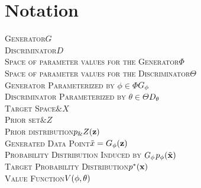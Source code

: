 \section*{Notation}
\vspace{3cm}
\begin{center}
  \begin{minipage}[c]{0.8\linewidth}
    \begin{center}
      \scshape
      Generator\dotfill $G$ \\
      Discriminator\dotfill $D$ \\
      Space of parameter values for the Generator\dotfill $\Phi$ \\
      Space of parameter values for the Discriminator\dotfill $\Theta$ \\
      Generator Parameterized by $\phi \in \Phi$\dotfill $G_\phi$ \\
      Discriminator Parameterized by $\theta \in \Theta$\dotfill $D_\theta$ \\
      Target Space\dotfill $\&X$ \\
      Prior set\dotfill $\&Z$ \\
      Prior distribution\dotfill $p_\&Z(\mathbf{z})$ \\
      Generated Data Point\dotfill $\tilde{x} = G_\phi(\mathbf{z})$ \\
      Probability Distribution Induced by $G_\phi$\dotfill $p_{\phi}(\tilde{\mathbf{x}})$ \\
      Target Probability Distribution\dotfill $p^*(\mathbf{x})$ \\
      Value Function\dotfill $V(\phi, \theta)$ \\
    \end{center}
  \end{minipage}
\end{center}

